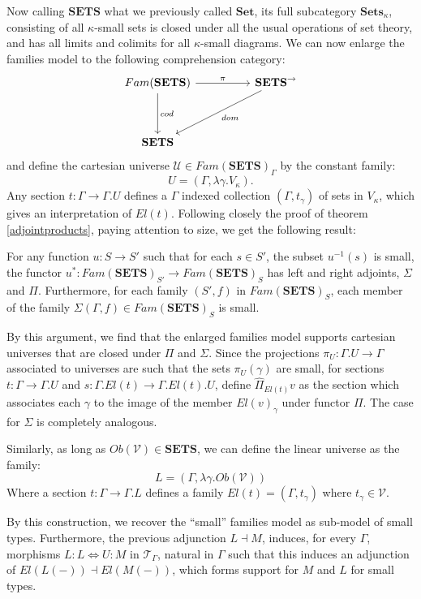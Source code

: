 Now calling $\mathbf{SETS}$ what we previously called $\mathbf{Set}$, its full subcategory $\mathbf{Sets}_\kappa$, consisting of all $\kappa$-small sets is closed under all the usual operations of set theory, and has all limits and colimits for all $\kappa$-small diagrams. We can now enlarge the families model to the following comprehension category:
\[
  \ti
  Fam(\mathbf{SETS}) \ar[r, "\pi"] \ar[d, "cod"] & \mathbf{SETS}^\to \ar[ld, "dom"]\\
  \mathbf{SETS}
  \kz
\]
and define the cartesian universe $\mathcal{U} \in Fam(\mathbf{SETS})_\Gamma$ by the constant family:
\[
U = (\Gamma, \lambda \gamma. V_\kappa).
\]
Any section $t : \Gamma \to \Gamma.U$ defines a $\Gamma$ indexed collection $(\Gamma, t_\gamma)$ of sets in $V_\kappa$, which gives an interpretation of $El(t)$. Following closely the proof of theorem \ref{adjointproducts}, paying attention to size, we get the following result:
\begin{corl}
  For any function $u : S \to S'$  such that for each $s \in S'$, the subset $u^{-1}(s)$ is small, the functor  $u^* : Fam(\mathbf{SETS})_{S'} \to Fam(\mathbf{SETS})_S$ has left and right adjoints, $\Sigma$ and $\Pi$. Furthermore, for each family $(S', f)$ in $Fam(\mathbf{SETS})_S$, each member of the family $\Sigma(\Gamma, f) \in Fam(\mathbf{SETS})_S$ is small.
\end{corl}
By this argument, we find that the enlarged families model supports cartesian universes that are closed under $\Pi$ and $\Sigma$. Since the projections $\pi_U : \Gamma.U \to \Gamma$ associated to universes are such that the sets $\pi_U(\gamma)$ are small, for sections $t : \Gamma \to \Gamma.U$ and $s : \Gamma.El(t) \to \Gamma.El(t).U$, define $\hat \Pi_{El(t)}v$ as the section which associates each $\gamma$ to the image of the member $El(v)_\gamma$ under functor $\Pi$. The case for $\Sigma$ is completely analogous.


Similarly, as long as $Ob(\mathcal{V}) \in \mathbf{SETS}$, we can define the linear universe as the family:
\[
  L = (\Gamma, \lambda \gamma. Ob(\mathcal{V}))
\]
Where a section $t : \Gamma \to \Gamma.L$ defines a family $El(t) = (\Gamma, t_\gamma)$ where $t_\gamma \in \mathcal{V}$.

By this construction, we recover the ``small'' families model as sub-model of small types. Furthermore, the previous adjunction $L \dashv M$, induces, for every $\Gamma$, morphisms $L : L \iff U : M$ in $\mathcal{T}_{\Gamma}$, natural in $\Gamma$ such that this induces an adjunction of $El(L(-)) \dashv El(M(-))$, which forms support for $M$ and $L$ for small types.
